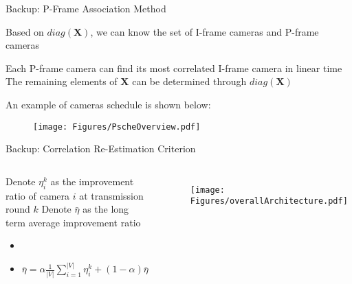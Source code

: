 \begin{frame}[noframenumbering]{Backup: P-Frame Association Method}
\begin{itemize}
	\myItem Based on $diag(\mathbf{X})$, we can know the set of I-frame cameras and P-frame cameras
	\begin{itemize}
		\mySubItem Each P-frame camera can find its most correlated I-frame camera in linear time
		\mySubItem The remaining elements of $\mathbf{X}$ can be determined through $diag(\mathbf{X})$
	\end{itemize}
	\myItem An example of cameras schedule is shown below:
	\begin{figure}
		\centering
		\texttt{[image: Figures/PscheOverview.pdf]}
	\end{figure}
\end{itemize}
\end{frame}
\begin{frame}[noframenumbering]{Backup: Correlation Re-Estimation Criterion}
\begin{columns}
\begin{itemize}
	\myItem Denote $\eta_i^k$ as the improvement ratio of camera $i$ at transmission round $k$
	\myItem Denote $\bar{\eta}$ as the long term average improvement ratio
	\begin{itemize}
		\mySubItem After transmission round $k$, $\bar{\eta}$ can be updated as:
		\item[]
		\item[] {\small $\bar{\eta} = \alpha \frac{1}{|V|} \sum_{i=1}^{|V|} \eta^k_i + (1-\alpha)\bar{\eta}$}
	\end{itemize}
\end{itemize}
%
\begin{figure}
\centering
\texttt{[image: Figures/overallArchitecture.pdf]}
\end{figure}
\end{columns}
%
\end{frame}
